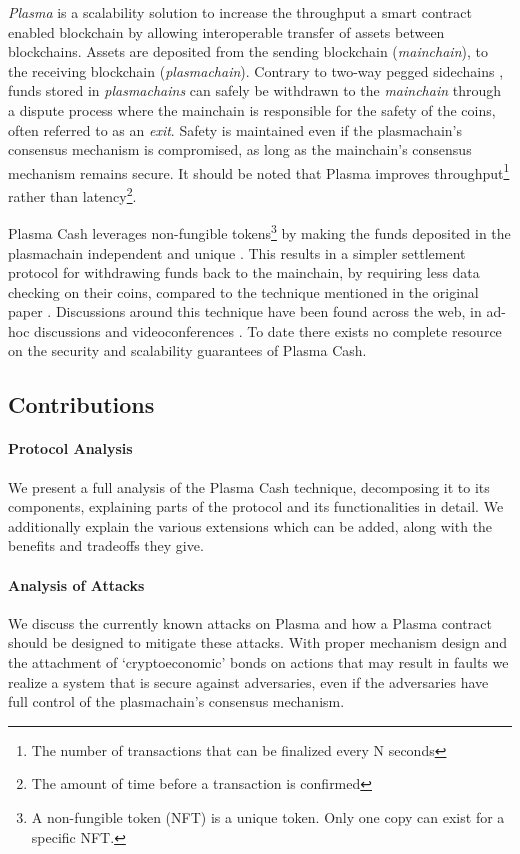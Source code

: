 

\textit{Plasma} is a scalability solution to increase the 
throughput a smart contract enabled blockchain by allowing 
interoperable transfer of assets between blockchains. Assets are deposited 
from the sending blockchain (\textit{mainchain}), to
the receiving blockchain (\textit{plasmachain}).
Contrary to two-way pegged sidechains \cite{sidechains}, funds stored in
\textit{plasmachains} can safely be withdrawn to the \textit{mainchain} through a
dispute process where the mainchain is responsible for the safety of the coins, often referred to as an \textit{exit}. Safety is maintained even if the
plasmachain's consensus mechanism is compromised, as long as the
mainchain's consensus mechanism remains secure. It should be noted that
Plasma improves throughput\footnote{The number of transactions that can be
finalized every N seconds} rather than latency\footnote{The amount of time
before a transaction is confirmed}.

Plasma Cash leverages non-fungible tokens\footnote{A non-fungible token (NFT) is a unique token. Only one copy can exist for a specific NFT.} by making the funds deposited in the plasmachain independent and unique \cite{plasma_cash}. This results in a simpler settlement protocol for withdrawing funds back to the mainchain, by requiring less data checking on their coins, compared to the technique mentioned in the original paper \cite{plasma}. %
Discussions around this technique have been found across  the web, in ad-hoc 
discussions and videoconferences \cite{implementers_call}. To date there exists no 
complete resource on the security and scalability guarantees of Plasma Cash.

\subsection{Contributions} \label{contribs}

\paragraph{Protocol Analysis} We present a full analysis of the Plasma Cash
technique, decomposing it to its components, explaining parts of the
protocol and its functionalities in detail. We additionally explain the various
extensions which can be added, along with the benefits and
tradeoffs they give.

\paragraph{Analysis of Attacks} We discuss the currently known attacks on
Plasma and how a Plasma contract should be designed to mitigate these attacks. 
With proper mechanism design and the attachment of `cryptoeconomic' bonds on
actions that may result in faults we realize a system that is secure
against adversaries, even if the adversaries have full control of the plasmachain's consensus mechanism.

